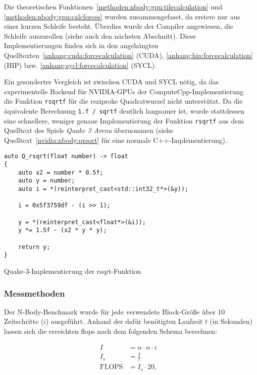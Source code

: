 Die theoretischen Funktionen~\ref{methoden:nbody:gpu:tilecalculation} und
\ref{methoden:nbody:gpu:calcforces} wurden zusammengefasst, da erstere
nur aus einer kurzen Schleife besteht. Überdies wurde der Compiler angewiesen,
die Schleife auszurollen (siehe auch den nächsten Abschnitt). Diese
Implementierungen finden sich in den angehängten
Quelltexten~\ref{anhang:cuda:forcecalculation} (CUDA),
\ref{anhang:hip:forcecalculation} (HIP) bzw. \ref{anhang:sycl:forcecalculation}
(SYCL).

Ein gesonderter Vergleich ist zwischen CUDA und SYCL nötig, da das
experimentelle Backend für NVIDIA-GPUs der ComputeCpp-Implementierung die
Funktion \texttt{rsqrtf} für die reziproke Quadratwurzel nicht unterstützt. Da
die äquivalente Berechnung \texttt{1.f / sqrtf} deutlich langsamer ist, wurde
stattdessen eine schnellere, weniger genaue Implementierung der Funktion
\texttt{rsqrtf} aus dem Quelltext des Spiels \textit{Quake 3 Arena} übernommen
(siehe Quelltext~\ref{nvidia:nbody:qrsqrt} für eine normale
C++-Implementierung).

\begin{code}
    \begin{verbatim}
auto Q_rsqrt(float number) -> float
{
    auto x2 = number * 0.5f;
    auto y = number;
    auto i = *(reinterpret_cast<std::int32_t*>(&y));

    i = 0x5f3759df - (i >> 1);

    y = *(reinterpret_cast<float*>(&i));
    y *= 1.5f - (x2 * y * y);

    return y;
}
    \end{verbatim}
    \caption{Quake-3-Implementierung der rsqrt-Funktion}
    \label{nvidia:nbody:qrsqrt}
\end{code}

\subsubsection{Messmethoden}
\label{nvidia:nbody:methoden}

Der N-Body-Benchmark wurde für jede verwendete Block-Größe über 10 Zeitschritte
($i$) ausgeführt. Anhand der dafür benötigten Laufzeit $t$ (in
Sekunden) lassen sich die erreichten \gls{flops} nach dem folgenden Schema
berechnen:

\begin{align*}
    I &= n \cdot n \cdot i\\
    I_s &= \frac{I}{t}\\
    \text{FLOPS} &= I_s \cdot 20,
\end{align*}

